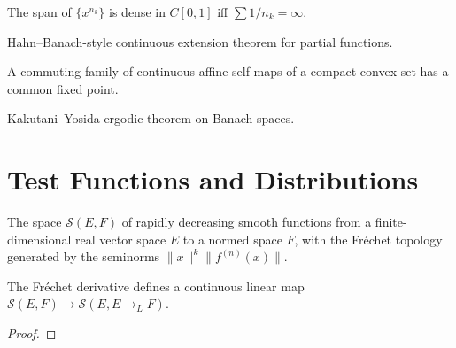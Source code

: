 \begin{theorem}
  \label{thm:muntz-szasz}
  \leanok
  The span of $\{x^{n_k}\}$ is dense in $C[0,1]$ iff
  $\sum 1/n_k = \infty$.
\end{theorem}

\begin{theorem}
  \label{thm:partial-cont-extension}
  \leanok
  Hahn--Banach-style continuous extension theorem for partial
  functions.
\end{theorem}

\begin{theorem}
  \label{thm:markov-kakutani}
  \leanok
  A commuting family of continuous affine self-maps of a compact
  convex set has a common fixed point.
\end{theorem}

\begin{theorem}
  \label{thm:kakutani-yosida}
  \leanok
  Kakutani--Yosida ergodic theorem on Banach spaces.
\end{theorem}

\chapter{Test Functions and Distributions}

\begin{definition}
  \label{def:schwartz}
  \leanok
  The space $\mathcal{S}(E,F)$ of rapidly decreasing smooth functions
  from a finite-dimensional real vector space $E$ to a normed space
  $F$, with the Fréchet topology generated by the seminorms
  $\|x\|^k \|f^{(n)}(x)\|$.
\end{definition}

\begin{theorem}
  \label{thm:fderiv-schwartz}
  \leanok
  The Fréchet derivative defines a continuous linear map
  $\mathcal{S}(E,F) \to \mathcal{S}(E, E\!\to_L\! F)$.
\end{theorem}
\begin{proof}
  \leanok
\end{proof}

